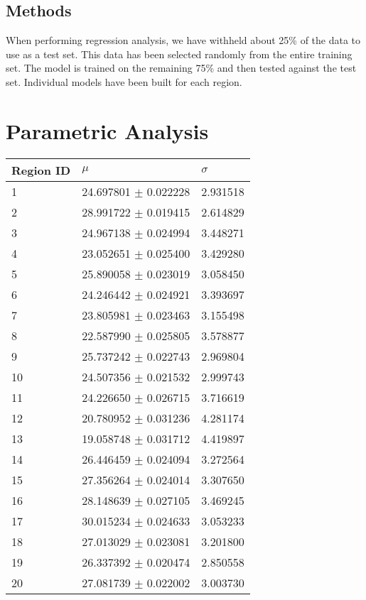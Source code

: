 \documentclass[12pt]{article}
\begin{document}
\begin{multicols*}{2}
\subsection{Methods}
When performing regression analysis, we have withheld about 25\% of the data to use as a test set. This data has been selected randomly from the entire training set. The model is trained on the remaining 75\% and then tested against the test set. Individual models have been built for each region.
\section{Parametric Analysis}
\begin{table}
\begin{tabular}{|l|l|l|}
\hline
Region ID & $\mu$ & $\sigma$\\\hline
1 & 24.697801 $\pm$ 0.022228 & 2.931518\\\hline
2 & 28.991722 $\pm$ 0.019415 & 2.614829\\\hline
3 & 24.967138 $\pm$ 0.024994 & 3.448271\\\hline
4 & 23.052651 $\pm$ 0.025400 & 3.429280\\\hline
5 & 25.890058 $\pm$ 0.023019 & 3.058450\\\hline
6 & 24.246442 $\pm$ 0.024921 & 3.393697\\\hline
7 & 23.805981 $\pm$ 0.023463 & 3.155498\\\hline
8 & 22.587990 $\pm$ 0.025805 & 3.578877\\\hline
9 & 25.737242 $\pm$ 0.022743 & 2.969804\\\hline
10 & 24.507356 $\pm$ 0.021532 & 2.999743\\\hline
11 & 24.226650 $\pm$ 0.026715 & 3.716619\\\hline
12 & 20.780952 $\pm$ 0.031236 & 4.281174\\\hline
13 & 19.058748 $\pm$ 0.031712 & 4.419897\\\hline
14 & 26.446459 $\pm$ 0.024094 & 3.272564\\\hline
15 & 27.356264 $\pm$ 0.024014 & 3.307650\\\hline
16 & 28.148639 $\pm$ 0.027105 & 3.469245\\\hline
17 & 30.015234 $\pm$ 0.024633 & 3.053233\\\hline
18 & 27.013029 $\pm$ 0.023081 & 3.201800\\\hline
19 & 26.337392 $\pm$ 0.020474 & 2.850558\\\hline
20 & 27.081739 $\pm$ 0.022002 & 3.003730\\\hline

\end{tabular}
\end{table}
\end{multicols*}
\end{document}

